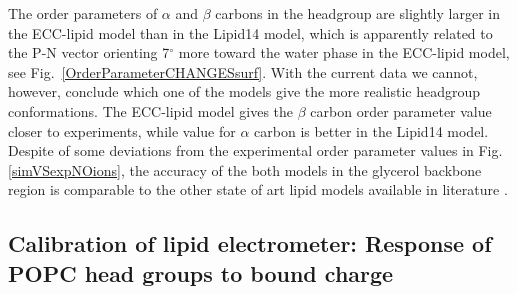 \documentclass[aip,jcp,twocolumn]{revtex4}
\begin{document}
The order parameters of $\alpha$ and $\beta$ carbons in the headgroup are slightly larger
in the ECC-lipid model than in the Lipid14 model, which is apparently related to the
P-N vector orienting 7$^{\circ}$ more toward the water phase in the ECC-lipid model, 
see Fig.~\ref{OrderParameterCHANGESsurf}. With the current data we cannot,
however, conclude which one of the models give the more realistic
headgroup conformations. The ECC-lipid model gives
the $\beta$ carbon order parameter value closer to experiments, while
value for $\alpha$ carbon is better in the Lipid14 model.
Despite of some deviations from the experimental order parameter values
in Fig. \ref{simVSexpNOions},
the accuracy of the both models in the glycerol backbone region
is comparable to the other state
of art lipid models available in literature \cite{botan15}.



\subsection{Calibration of lipid electrometer:
            Response of POPC head groups to bound charge}\label{section:boundCHARGE}
\end{document}
